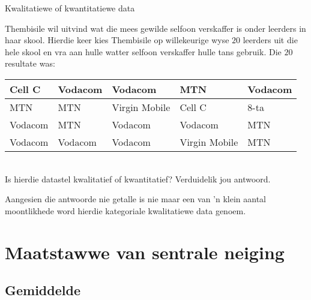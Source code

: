 \begin{wex}{Kwalitatiewe of kwantitatiewe data}
{Thembisile wil uitvind wat die mees gewilde selfoon verskaffer is onder leerders in haar skool. Hierdie keer kies Thembisile op willekeurige wyse $20$ leerders uit die hele skool en vra aan hulle watter selfoon verskaffer hulle tans gebruik.
 Die $20$ resultate was:

    \begin{center}
      \begin{tabular}{|p{}|p{}|p{}|p{}|p{}|}\hline
        
        Cell C & Vodacom & Vodacom & MTN & Vodacom \\\hline
        MTN & MTN & Virgin Mobile & Cell C & 8-ta \\\hline
        Vodacom & MTN & Vodacom & Vodacom & MTN \\\hline
        Vodacom & Vodacom & Vodacom & Virgin Mobile & MTN \\\hline
      \end{tabular}
    \end{center}
\vspace{8pt}\\
    Is hierdie datastel kwalitatief of kwantitatief? Verduidelik jou antwoord.
}{

  Aangesien die antwoorde nie getalle is nie maar een van 'n klein aantal moontlikhede word hierdie kategoriale kwalitatiewe data genoem.
}
\end{wex}

\section{Maatstawwe van sentrale neiging}

\subsection{Gemiddelde}

